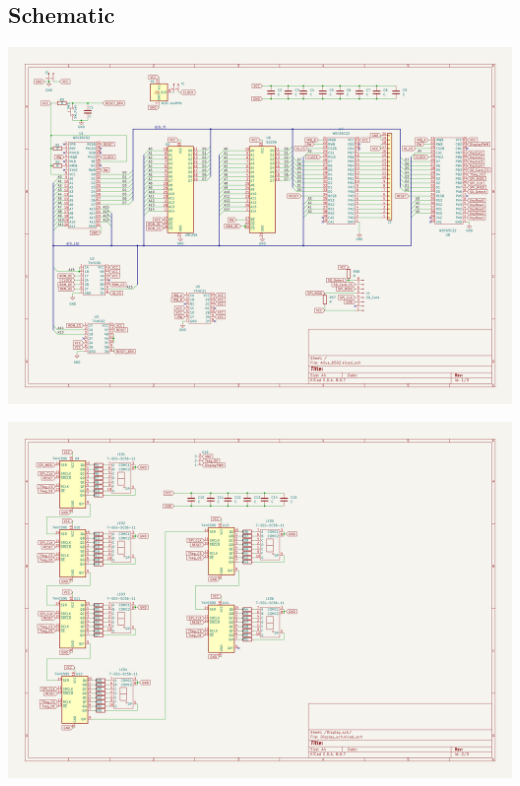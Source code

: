 \documentclass{ol-softwaremanual}
\begin{document}
\begin{ffcode}
\subsection{Schematic}
\begin{center}
\includegraphics[angle=90,origin=c, width=14.1cm]{Compute.PNG}
\end{center}

\pagebreak

\begin{center}
\includegraphics[angle=90,origin=c, width=14.1cm]{Display.PNG}
\end{center}

\pagebreak


\end{ffcode}
\end{document}
